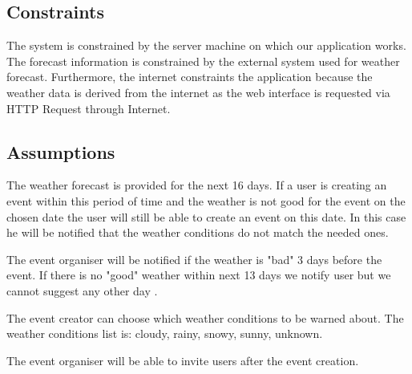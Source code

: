 \subsection{Constraints}
\quad The system is constrained by the server machine on which our application works. The forecast information is constrained by the external system used for weather forecast. Furthermore, the internet constraints the application because the weather data is derived from the internet as the web interface is requested via HTTP Request through Internet.
\subsection{Assumptions}
\quad The weather forecast is provided for the next 16 days. If a user is creating an event within this period of time and the weather is not good for the event on the chosen date the user will still be able to create an event on this date. In this case he will be notified that the weather conditions do not match the needed ones.
\par The event organiser will be notified if the weather is "bad" 3 days before the event. If there is no "good" weather within next 13 days we notify user but we cannot suggest any other day .
\par The event creator can choose which weather conditions to be warned about. The weather conditions list is: cloudy, rainy, snowy, sunny, unknown.
\par The event organiser will be able to invite users after the event creation.
